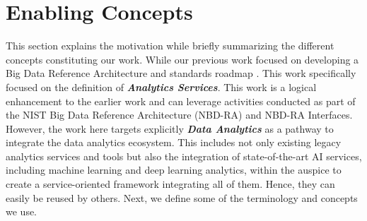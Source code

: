 

\section{Enabling Concepts}\label{s:background}

This section explains the motivation while briefly summarizing the different concepts constituting our work. While our previous work
focused on developing a Big Data Reference Architecture and standards
roadmap \cite{nist-v8}. This work specifically focused on the
definition of {\bf\em Analytics Services}. This work is a logical
enhancement to the earlier work and can leverage activities conducted
as part of the NIST Big Data Reference Architecture (NBD-RA) and
NBD-RA Interfaces. However, the work here targets explicitly {\bf\em
Data Analytics} as a pathway to integrate the data analytics
ecosystem. This includes not only existing legacy analytics
services and tools but also the integration of state-of-the-art AI
services, including machine learning and deep learning analytics, within
the auspice to create a service-oriented framework integrating all of
them. Hence, they can easily be reused by others. Next, we define some
of the terminology and concepts we use.


